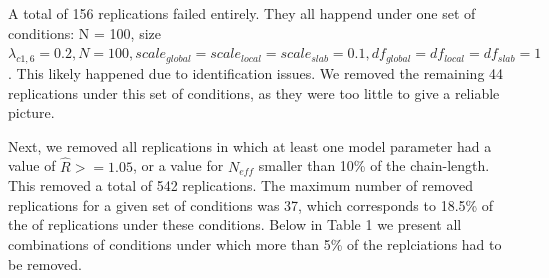\documentclass[
  man, donotrepeattitle,floatsintext]{apa6}
\begin{document}
A total of 156 replications failed entirely. They all happend under one set of conditions: N = 100, size \(\lambda_{c1,6} = 0.2, N = 100, scale_{global} = scale_{local} = scale_{slab} = 0.1, df_{global} = df_{local} = df_{slab} = 1\). This likely happened due to identification issues. We removed the remaining 44 replications under this set of conditions, as they were too little to give a reliable picture.

Next, we removed all replications in which at least one model parameter had a value of \(\hat{R} >= 1.05\), or a value for \(N_{eff}\) smaller than 10\% of the chain-length. This removed a total of 542 replications. The maximum number of removed replications for a given set of conditions was 37, which corresponds to 18.5\% of the of replications under these conditions. Below in Table 1 we present all combinations of conditions under which more than 5\% of the replciations had to be removed.
\end{document}
